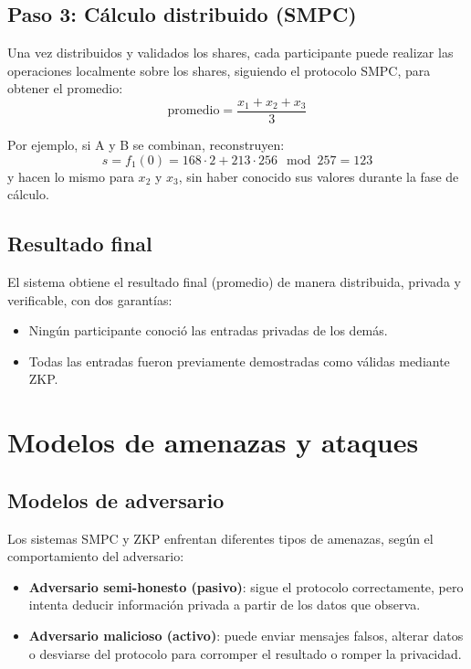 \documentclass{article}
\begin{document}
\subsection{Paso 3: Cálculo distribuido (SMPC)}

Una vez distribuidos y validados los shares, cada participante puede realizar las operaciones localmente sobre los shares, siguiendo el protocolo SMPC, para obtener el promedio:
\[
\text{promedio} = \frac{x_1 + x_2 + x_3}{3}
\]

Por ejemplo, si A y B se combinan, reconstruyen:
\[
s = f_1(0) = 168 \cdot 2 + 213 \cdot 256 \mod 257 = 123
\]
y hacen lo mismo para \( x_2 \) y \( x_3 \), sin haber conocido sus valores durante la fase de cálculo.

\subsection{Resultado final}

El sistema obtiene el resultado final (promedio) de manera distribuida, privada y verificable, con dos garantías:
\begin{itemize}
    \item Ningún participante conoció las entradas privadas de los demás.
    \item Todas las entradas fueron previamente demostradas como válidas mediante ZKP.
\end{itemize}

\section{Modelos de amenazas y ataques}

\subsection{Modelos de adversario}

Los sistemas SMPC y ZKP enfrentan diferentes tipos de amenazas, según el comportamiento del adversario:
\begin{itemize}
    \item \textbf{Adversario semi-honesto (pasivo)}: sigue el protocolo correctamente, pero intenta deducir información privada a partir de los datos que observa.
    \item \textbf{Adversario malicioso (activo)}: puede enviar mensajes falsos, alterar datos o desviarse del protocolo para corromper el resultado o romper la privacidad.
\end{itemize}
\end{document}
